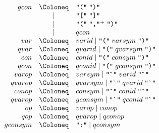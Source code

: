 \begin{align*}
  \begin{array}{rcl}
    {gcon}
    & \Coloneq & \text{\texttt{\textquotedbl(\textquotedbl}}\; \text{\texttt{\textquotedbl)\textquotedbl}} \\
    & \mid & \text{\texttt{\textquotedbl[\textquotedbl}}\; \text{\texttt{\textquotedbl]\textquotedbl}} \\
    & \mid & \text{\texttt{\textquotedbl(\textquotedbl}}\; \text{\texttt{\textquotedbl,\textquotedbl}}^+\; \text{\texttt{\textquotedbl)\textquotedbl}} \\
    & \mid & {qcon} \\
    {var}
    & \Coloneq & {varid} \mid \text{\texttt{\textquotedbl(\textquotedbl}}\; {varsym}\; \text{\texttt{\textquotedbl)\textquotedbl}} \\
    {qvar}
    & \Coloneq & {qvarid} \mid \text{\texttt{\textquotedbl(\textquotedbl}}\; {qvarsym}\; \text{\texttt{\textquotedbl)\textquotedbl}} \\
    {con}
    & \Coloneq & {conid} \mid \text{\texttt{\textquotedbl(\textquotedbl}}\; {consym}\; \text{\texttt{\textquotedbl)\textquotedbl}} \\
    {qcon}
    & \Coloneq & {qconid} \mid \text{\texttt{\textquotedbl(\textquotedbl}}\; {gconsym}\; \text{\texttt{\textquotedbl)\textquotedbl}} \\
    {varop}
    & \Coloneq & {varsym} \mid \text{\texttt{\textquotedbl\textasciigrave\textquotedbl}}\; {varid}\; \text{\texttt{\textquotedbl\textasciigrave\textquotedbl}} \\
    {qvarop}
    & \Coloneq & {qvarsym} \mid \text{\texttt{\textquotedbl\textasciigrave\textquotedbl}}\; {qvarid}\; \text{\texttt{\textquotedbl\textasciigrave\textquotedbl}} \\
    {conop}
    & \Coloneq & {consym} \mid \text{\texttt{\textquotedbl\textasciigrave\textquotedbl}}\; {conid}\; \text{\texttt{\textquotedbl\textasciigrave\textquotedbl}} \\
    {qvarop}
    & \Coloneq & {gconsym} \mid \text{\texttt{\textquotedbl\textasciigrave\textquotedbl}}\; {qconid}\; \text{\texttt{\textquotedbl\textasciigrave\textquotedbl}} \\
    {op}
    & \Coloneq & {varop} \mid {conop} \\
    {qop}
    & \Coloneq & {qvarop} \mid {qconop} \\
    {gconsym}
    & \Coloneq & \text{\texttt{\textquotedbl :\textquotedbl}} \mid {qconsym}
  \end{array}
\end{align*}

